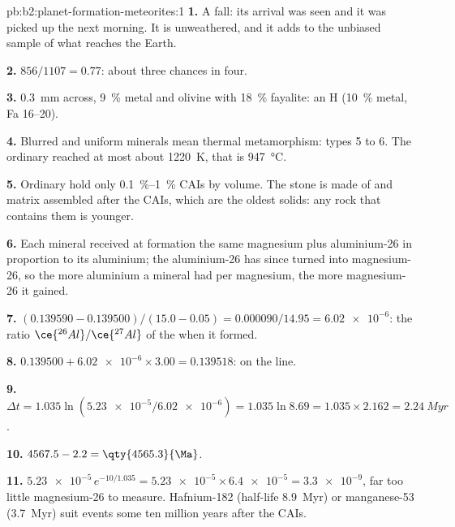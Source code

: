 \begin{solution}{pb:b2:planet-formation-meteorites:1}
\textbf{1.} A fall: its arrival was seen and it was picked up the next morning.
It is unweathered, and it adds to the unbiased sample of what reaches the Earth.

\textbf{2.} $856/1107 = 0.77$: about three chances in four.

\textbf{3.}  \qty{0.3}{mm} across, \qty{9}{\percent} metal and olivine with
\qty{18}{\percent} fayalite: an H  (\qty{10}{\percent} metal, Fa 16--20).

\textbf{4.} Blurred  and uniform minerals mean thermal metamorphism: types
5 to 6. The ordinary  reached at most about \qty{1220}{K}, that is
\qty{947}{\degreeCelsius}.

\textbf{5.} Ordinary  hold only \qtyrange{0.1}{1}{\percent} CAIs by
volume. The stone is made of  and matrix assembled after the CAIs, which
are the oldest solids: any rock that contains them is younger.

\textbf{6.} Each mineral received at formation the same magnesium plus aluminium-26
in proportion to its aluminium; the aluminium-26 has since turned into
magnesium-26, so the more aluminium a mineral had per magnesium, the more
magnesium-26 it gained.

\textbf{7.} $(0.139590 - 0.139500)/(15.0 - 0.05) = \num{0.000090}/14.95 =
\num{6.02e-6}$: the ratio $\ce{^{26}Al}/\ce{^{27}Al}$ of the  when it
formed.

\textbf{8.} $0.139500 + \num{6.02e-6}\times3.00 = 0.139518$: on the line.

\textbf{9.} $\Delta t = 1.035\ln(\num{5.23e-5}/\num{6.02e-6}) = 1.035\ln8.69 =
1.035\times2.162 = \qty{2.24}{Myr}$.

\textbf{10.} $4567.5 - 2.2 = \qty{4565.3}{\Ma}$.

\textbf{11.} $\num{5.23e-5}\,e^{-10/1.035} = \num{5.23e-5}\times\num{6.4e-5} =
\num{3.3e-9}$, far too little magnesium-26 to measure. Hafnium-182 (half-life
\qty{8.9}{Myr}) or manganese-53 (\qty{3.7}{Myr}) suit events some ten million years
after the CAIs.


\end{solution}

